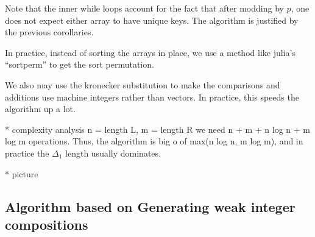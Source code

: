 Note that the inner while loops account for the fact that
after modding by \(p\), one does not expect 
either array to have unique keys.
The algorithm is justified by the previous corollaries.

In practice, instead of sorting the arrays in place, 
we use a method like julia's ``sortperm''
to get the sort permutation.

We also may use the kronecker substitution to make
the comparisons and additions use machine integers
rather than vectors.
In practice, this speeds the algorithm up a lot.

* complexity analysis
n = length L, m = length R
we need n + m + n log n + m log m operations.
Thus, the algorithm is big o of max(n log n, m log m),
and in practice the \(\Delta_{1}\) length
usually dominates.

* picture

\subsection{Algorithm based on Generating weak integer compositions}









